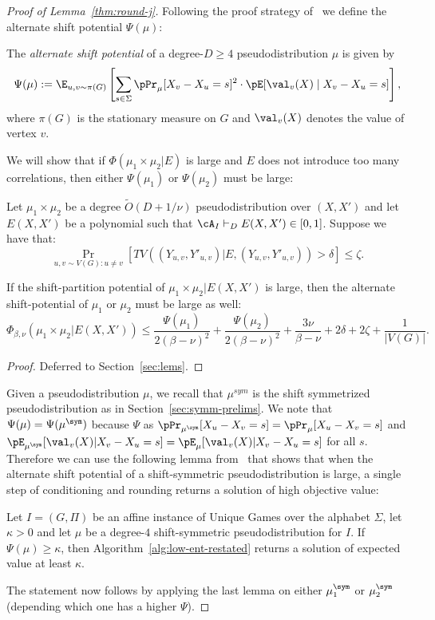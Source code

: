  
\begin{proof}[Proof of Lemma~\ref{thm:round-j}]
Following the proof strategy of~\cite{BBKSS} we define the alternate shift potential $\Psi(\mu)$:
\begin{definition}
The {\em alternate shift potential} of a degree-$D \ge 4$ pseudodistribution $\mu$ is given by
\[
\Psi(\mu) := \E_{u,v \sim \pi(G)} \left[\sum_{s \in \Sigma} \pPr_\mu[X_v - X_u = s]^2 \cdot \pE[\val_v(X) \mid X_v - X_u = s] \right],
\]
where $\pi(G)$ is the stationary measure on $G$ and $\val_v(X)$ denotes the value of vertex $v$.
\end{definition}

We will show that if $\Phi(\mu_1 \times \mu_2 | E)$ is large and $E$ does not introduce too many correlations, then either $\Psi(\mu_1)$ or $\Psi(\mu_2)$ must be large:
\begin{lemma}\label{lem:relating-ent-j}
Let $\mu_1 \times \mu_2$ be a degree $\widetilde{O}(D+1/\nu)$ pseudodistribution over $(X,X')$ and let $E(X,X')$ be a polynomial such that $\cA_I \vdash_D E(X,X') \in [0,1]$. Suppose we have that: 
\[\Pr_{u,v \sim V(G): u \neq v}[TV((Y_{u,v},Y'_{u,v})|E , (Y_{u,v},Y'_{u,v})) > \delta] \leq \zeta.\]

If the shift-partition potential of $\mu_1 \times \mu_2 |E(X,X')$ is large, then the alternate shift-potential of $\mu_1$ or $\mu_2$ must be large as well:
\[\Phi_{\beta,\nu}(\mu_1 \times \mu_2 | E(X,X')) \leq \frac{\Psi(\mu_1)}{2(\beta-\nu)^2} +\frac{\Psi(\mu_2)}{2(\beta-\nu)^2} + \frac{3\nu}{\beta - \nu} + 2\delta + 2\zeta + \frac{1}{|V(G)|}.\]
\end{lemma}
\begin{proof}
Deferred to Section~\ref{sec:lems}.
\end{proof}
Given a pseudodistribution $\mu$, we 
recall that $\mu^{sym}$ is the shift symmetrized pseudodistribution as in Section~\ref{sec:symm-prelims}.
We note that $\Psi(\mu) = \Psi(\mu^{\sym})$ because $\Psi$ as $\pPr_{\mu^\sym}[X_u - X_v = s] = \pPr_{\mu}[X_u - X_v = s]$ and $\pE_{\mu^\sym}[\val_v(X)|X_v - X_u = s] = \pE_{\mu}[\val_v(X)|X_v - X_u = s]$ for all $s$.  Therefore we can use the following lemma from~\cite{BBKSS} that shows that when the alternate shift potential of a shift-symmetric pseudodistribution is large, a single step of conditioning and rounding returns a solution of high objective value:
\begin{lemma}
Let $I = (G, \Pi)$ be an affine instance of Unique Games over the alphabet $\Sigma$, let $\kappa>0$ and 
let $\mu$ be a degree-$4$ shift-symmetric pseudodistribution for $I$. If $\Psi(\mu) \geq \kappa$, then Algorithm~\ref{alg:low-ent-restated} returns a solution of expected value at least $\kappa$.
\end{lemma}

The statement now follows by applying the last lemma on either $\mu^\sym_1$ or $\mu^\sym_2$ (depending 
which one has a higher $\Psi$).
\end{proof}

